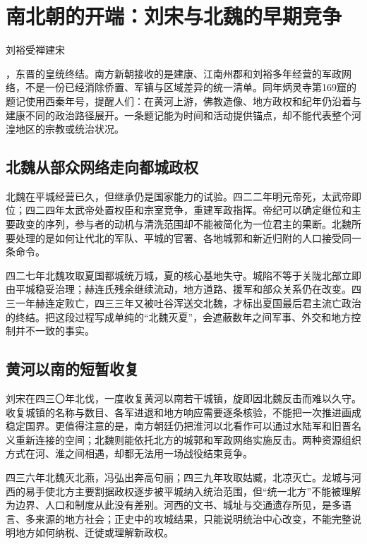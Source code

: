 \section{南北朝的开端：刘宋与北魏的早期竞争}
\label{sec:northern-southern-early-competition}

\hypertarget{evt:JH-0420-LIU-YU-FOUNDS-SONG}{\textcolor{dynasty}{刘裕受禅建宋}}，东晋的皇统终结。南方新朝接收的是建康、江南州郡和刘裕多年经营的军政网络，不是一份已经消除侨置、军镇与区域差异的统一清单。同年炳灵寺第169窟的题记使用西秦年号，提醒人们：在黄河上游，佛教造像、地方政权和纪年仍沿着与建康不同的政治路径展开。一条题记能为时间和活动提供锚点，却不能代表整个河湟地区的宗教或统治状况。

\subsection{北魏从部众网络走向都城政权}

北魏在平城经营已久，但继承仍是国家能力的试验。四二二年明元帝死，太武帝即位；四二四年太武帝处置权臣和宗室竞争，重建军政指挥。帝纪可以确定继位和主要政变的序列，参与者的动机与清洗范围却不能被简化为一位君主的果断。北魏所要处理的是如何让代北的军队、平城的官署、各地城郭和新近归附的人口接受同一条命令。

四二七年北魏攻取夏国都城统万城，夏的核心基地失守。城陷不等于关陇北部立即由平城稳妥治理；赫连氏残余继续流动，地方道路、援军和部众关系仍在改变。四三一年赫连定败亡，四三三年又被吐谷浑送交北魏，才标出夏国最后君主流亡政治的终结。把这段过程写成单纯的“北魏灭夏”，会遮蔽数年之间军事、外交和地方控制并不一致的事实。

\subsection{黄河以南的短暂收复}

刘宋在四三〇年北伐，一度收复黄河以南若干城镇，旋即因北魏反击而难以久守。收复城镇的名称与数目、各军进退和地方响应需要逐条核验，不能把一次推进画成稳定国界。更值得注意的是，南方朝廷仍把淮河以北看作可以通过水陆军和旧晋名义重新连接的空间；北魏则能依托北方的城郭和军政网络实施反击。两种资源组织方式在河、淮之间相遇，却都无法用一场战役结束竞争。

四三六年北魏灭北燕，冯弘出奔高句丽；四三九年攻取姑臧，北凉灭亡。龙城与河西的易手使北方主要割据政权逐步被平城纳入统治范围，但“统一北方”不能被理解为边界、人口和制度从此没有差别。河西的文书、城址与交通遗存所见，是多语言、多来源的地方社会；正史中的攻城结果，只能说明统治中心改变，不能完整说明地方如何纳税、迁徙或理解新政权。


